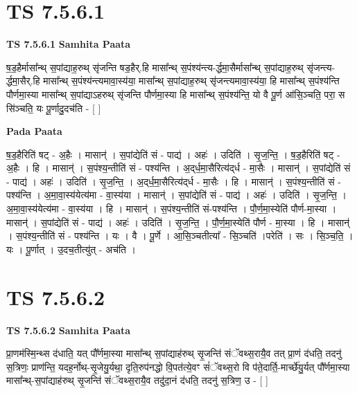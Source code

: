 \documentclass[17pt]{extarticle}
\begin{document}
\section*{ TS 7.5.6.1 }

\textbf{TS 7.5.6.1 } \newline
\textbf{Samhita Paata} \newline

ष॒ड॒हैर्मासा᳚न्थ् स॒पांद्याह॒रुथ् सृ॑जन्ति षड॒हैर्.हि मासा᳚न्थ् स॒पंश्य॑न्त्य-र्द्धमा॒सैर्मासा᳚न्थ् स॒पांद्याह॒रुथ् सृ॑जन्त्य-र्द्धमा॒सैर्.हि मासा᳚न्थ् स॒पंश्य॑न्त्यमावा॒स्य॑या॒ मासा᳚न्थ् स॒पांद्याह॒रुथ् सृ॑जन्त्यमावा॒स्य॑या॒ हि मासा᳚न्थ् स॒पंश्य॑न्ति पौर्णमा॒स्या मासा᳚न्थ् स॒पांद्याऽहरुथ् सृ॑जन्ति पौर्णमा॒स्या हि मासा᳚न्थ् स॒पंश्य॑न्ति॒ यो वै पू॒र्ण आ॑सि॒ञ्चति॒ परा॒ स सि॑ञ्चति॒ यः पू॒र्णादु॒दच॑ति - [  ] \newline

\textbf{Pada Paata} \newline

ष॒ड॒हैरिति॑ षट् - अ॒हैः । मासान्॑ । स॒पांद्येति॑ सं - पाद्य॑ । अहः॑ । उदिति॑ । सृ॒ज॒न्ति॒ । ष॒ड॒हैरिति॑ षट् - अ॒हैः । हि । मासान्॑ । स॒पंश्य॒न्तीति॑ सं - पश्य॑न्ति । अ॒द्‌र्ध॒मा॒सैरित्य॑द्‌र्ध - मा॒सैः । मासान्॑ । स॒पांद्येति॑ सं - पाद्य॑ । अहः॑ । उदिति॑ । सृ॒ज॒न्ति॒ । अ॒द्‌र्ध॒मा॒सैरित्य॑द्‌र्ध - मा॒सैः । हि । मासान्॑ । स॒पंश्य॒न्तीति॑ सं - पश्य॑न्ति । अ॒मा॒वा॒स्य॑येत्य॑मा - वा॒स्य॑या । मासान्॑ । स॒पांद्येति॑ सं - पाद्य॑ । अहः॑ । उदिति॑ । सृ॒ज॒न्ति॒ । अ॒मा॒वा॒स्य॑येत्य॑मा - वा॒स्य॑या । हि । मासान्॑ । स॒पंश्य॒न्तीति॑ सं-पश्य॑न्ति । पौ॒र्ण॒मा॒स्येति॑ पौर्ण-मा॒स्या । मासान्॑ । स॒पांद्येति॑ सं - पाद्य॑ । अहः॑ । उदिति॑ । सृ॒ज॒न्ति॒ । पौ॒र्ण॒मा॒स्येति॑ पौर्ण - मा॒स्या । हि । मासान्॑ । स॒पंश्य॒न्तीति॑ सं - पश्य॑न्ति । यः । वै । पू॒र्णे । आ॒सि॒ञ्चतीत्या᳚ - सि॒ञ्चति॑ ।परेति॑ । सः । सि॒ञ्च॒ति॒ । यः । पू॒र्णात् । उ॒दच॒तीत्यु॑त् - अच॑ति ।  \newline




\section*{ TS 7.5.6.2 }

\textbf{TS 7.5.6.2 } \newline
\textbf{Samhita Paata} \newline

प्रा॒णम॑स्मि॒न्थ्स द॑धाति॒ यत् पौ᳚र्णमा॒स्या मासा᳚न्थ् स॒पांद्याह॑रुथ् सृ॒जन्ति॑ संॅवथ्स॒रायै॒व तत् प्रा॒णं द॑धति॒ तदनु॑ स॒त्रिणः॒ प्राण॑न्ति॒ यदह॒र्नोथ्-सृ॒जेयु॒र्यथा॒ दृति॒रुप॑नद्धो वि॒पत॑त्ये॒वꣳ सं॑ॅवथ्स॒रो वि प॑ते॒दार्ति॒-मार्च्छे॑यु॒र्यत् पौ᳚र्णमा॒स्या मासा᳚न्थ्-स॒पांद्याह॑रुथ् सृ॒जन्ति॑ संॅवथ्स॒रायै॒व तदु॑दा॒नं द॑धति॒ तदनु॑ स॒त्रिण॒ उ - [  ] \newline
\end{document}

